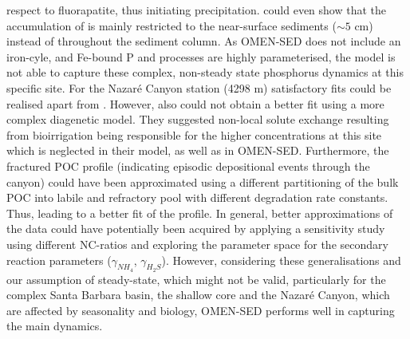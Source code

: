 \documentclass[gmd, manuscript]{copernicus}
\begin{document}
respect to fluorapatite, thus initiating  precipitation. \citet{reimers_porewater_1996} could even show that the accumulation of  is mainly restricted to the near-surface sediments ($\sim 5$ cm) 
instead of throughout the sediment column. %
As OMEN-SED does not include an iron-cyle, and Fe-bound P and  processes are highly parameterised, the model is not able to capture these complex, non-steady state phosphorus 
dynamics at this specific site. 
For the Nazar\'e Canyon station (4298 m) satisfactory fits could be realised apart from . However, also \citet{epping_oxidation_2002} could not obtain a better fit 
using a more complex diagenetic model. They suggested non-local solute exchange resulting from bioirrigation being responsible for the higher  concentrations at this site which is neglected in their model, as well as in 
OMEN-SED. Furthermore, the fractured POC profile (indicating episodic depositional events through the canyon) could have been approximated using a different partitioning of the bulk POC into 
labile and refractory pool with different degradation rate constants. Thus, leading to a better fit of the  profile.  
In general, better approximations of the data could have potentially been acquired by applying a sensitivity study using different NC-ratios \citep[e.g.][report different ratios from Redfield stoichiometry]{epping_oxidation_2002} 
and exploring the parameter space for the secondary reaction parameters ($\gamma_{NH_4}$, $\gamma_{H_2S}$). 
However, considering these generalisations and our assumption of steady-state, which might not be valid, particularly for the complex Santa Barbara basin, the shallow core and the Nazar\'e Canyon, which are affected by seasonality 
and biology, OMEN-SED performs well in capturing the main dynamics. 
\end{document}
